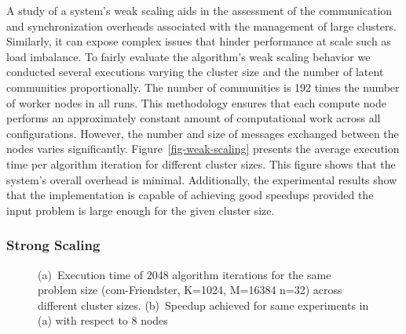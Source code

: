 A study of a system's weak scaling aids in the assessment of the communication
and synchronization overheads associated with the management of large clusters.
Similarly, it can expose complex issues that hinder performance at scale such
as load imbalance. To fairly evaluate the algorithm's weak scaling behavior we
conducted several executions varying the cluster size and the number of latent
communities proportionally. The number of communities is 192 times the number
of worker nodes in all runs.
This methodology ensures that each compute node
performs an approximately constant amount of computational work across all
configurations. However, the number and size of messages exchanged between the
nodes varies significantly. Figure~\ref{fig-weak-scaling} presents the
average execution
time per algorithm iteration for different cluster sizes.
This figure shows that the system's overall
overhead is minimal. Additionally, the experimental results show that the
implementation is capable of achieving good speedups provided the input problem
is large enough for the given cluster size.

\subsubsection{Strong Scaling}

\begin{figure}[tb] %
  \centering
  \caption{(a)~Execution time of 2048 algorithm iterations for the
  same problem size (com-Friendster, K=1024, M=16384 n=32) across different
  cluster sizes. (b)~Speedup achieved for same experiments in (a) with respect to
  8 nodes}
  \label{fig-strong-scaling}
\end{figure}

